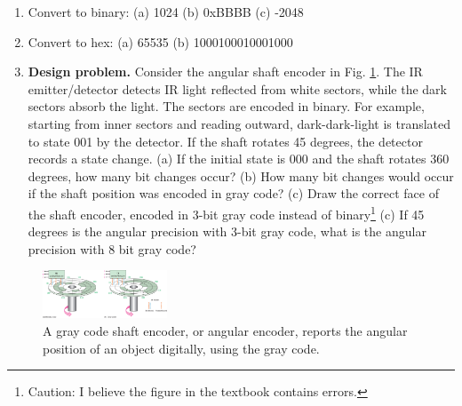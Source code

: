 \documentclass[10pt]{article}
\begin{document}
\begin{enumerate}
\item Convert to binary: (a) 1024 (b) 0xBBBB (c) -2048 \\ \vspace{1cm}
\item Convert to hex: (a) 65535 (b) 1000100010001000 \\ \vspace{1cm}
\item \textbf{Design problem.}  Consider the angular shaft encoder in Fig. \ref{fig:grayCode}.  The IR emitter/detector detects IR light reflected from white sectors, while the dark sectors absorb the light.  The sectors are encoded in binary.  For example, starting from inner sectors and reading outward, dark-dark-light is translated to state 001 by the detector.  If the shaft rotates 45 degrees, the detector records a state change.  (a) If the initial state is 000 and the shaft rotates 360 degrees, how many bit changes occur?  (b) How many bit changes would occur if the shaft position was encoded in gray code?  (c) Draw the correct face of the shaft encoder, encoded in 3-bit gray code instead of binary\footnote{Caution: I believe the figure in the textbook contains errors.} (c) If 45 degrees is the angular precision with 3-bit gray code, what is the angular precision with 8 bit gray code? \\ \vspace{2cm}
\end{enumerate}
\begin{figure}[hb]
\centering
\includegraphics[width=0.33\textwidth,trim=0cm 0cm 12cm 0cm,clip=true]{gray_code_shaft.jpg}
\caption{\label{fig:grayCode} A gray code shaft encoder, or angular encoder, reports the angular position of an object digitally, using the gray code.}
\end{figure}
\end{document}
